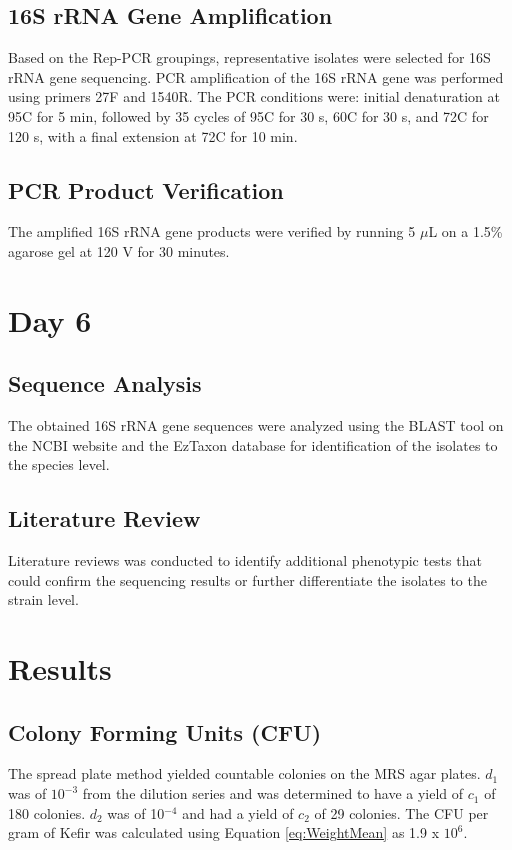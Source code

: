 \subsection*{16S rRNA Gene Amplification}
Based on the Rep-PCR groupings, representative isolates were selected for 16S rRNA gene sequencing. PCR amplification of the 16S rRNA gene was performed using primers 27F and 1540R. The PCR conditions were: initial denaturation at 95\textdegree C for 5 min, followed by 35 cycles of 95\textdegree C for 30 s, 60\textdegree C for 30 s, and 72\textdegree C for 120 s, with a final extension at 72\textdegree C for 10 min.

\subsection*{PCR Product Verification}
The amplified 16S rRNA gene products were verified by running 5 $\mu$L on a 1.5\% agarose gel at 120 V for 30 minutes.

\section{Day 6}
\subsection*{Sequence Analysis}
The obtained 16S rRNA gene sequences were analyzed using the BLAST tool on the NCBI website and the EzTaxon database for identification of the isolates to the species level.

\subsection*{Literature Review}
Literature reviews was conducted to identify additional phenotypic tests that could confirm the sequencing results or further differentiate the isolates to the strain level.

\section{Results}
\subsection{Colony Forming Units (CFU)}
The spread plate method yielded countable colonies on the MRS agar plates. $d_1$ was of $10^{-3}$ from the dilution series and was determined to have a yield of $c_1$ of 180 colonies. $d_2$ was of 10$^{-4}$ and had a yield of $c_2$ of 29 colonies. The CFU per gram of Kefir was calculated using Equation \ref*{eq:WeightMean} as 1.9 x $10^6$.

